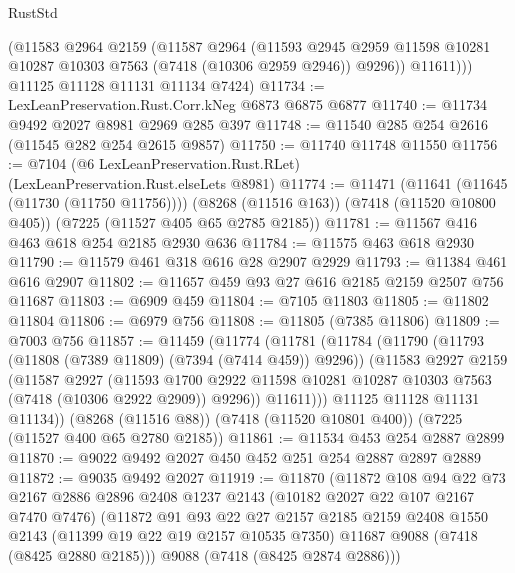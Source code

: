 \begin{lexlean}{RustStd}
\begin{coremodule}
          (@11583
            @2964
            @2159
            (@11587
              @2964
              (@11593
                @2945
                @2959
                @11598
                @10281
                @10287
                @10303
                @7563
                (@7418 (@10306 @2959 @2946))
                @9296))
            @11611)))
      @11125
      @11128
      @11131
      @11134
      @7424)
@11734 := LexLeanPreservation.Rust.Corr.kNeg @6873 @6875 @6877
@11740 := @11734 @9492 @2027 @8981 @2969 @285 @397
@11748 := @11540 @285 @254 @2616 (@11545 @282 @254 @2615 @9857)
@11750 := @11740 @11748 @11550
@11756 := @7104 (@6 LexLeanPreservation.Rust.RLet) (LexLeanPreservation.Rust.elseLets @8981)
@11774 := @11471
    (@11641 (@11645 (@11730 (@11750 @11756))))
    (@8268 (@11516 @163))
    (@7418 (@11520 @10800 @405))
    (@7225 (@11527 @405 @65 @2785 @2185))
@11781 := @11567 @416 @463 @618 @254 @2185 @2930 @636
@11784 := @11575 @463 @618 @2930
@11790 := @11579 @461 @318 @616 @28 @2907 @2929
@11793 := @11384 @461 @616 @2907
@11802 := @11657 @459 @93 @27 @616 @2185 @2159 @2507 @756 @11687
@11803 := @6909 @459
@11804 := @7105 @11803
@11805 := @11802 @11804
@11806 := @6979 @756
@11808 := @11805 (@7385 @11806)
@11809 := @7003 @756
@11857 := @11459
    (@11774
      (@11781
        (@11784
          (@11790
            (@11793 (@11808 (@7389 @11809) (@7394 (@7414 @459)) @9296))
            (@11583
              @2927
              @2159
              (@11587
                @2927
                (@11593
                  @1700
                  @2922
                  @11598
                  @10281
                  @10287
                  @10303
                  @7563
                  (@7418 (@10306 @2922 @2909))
                  @9296))
              @11611)))
        @11125
        @11128
        @11131
        @11134))
    (@8268 (@11516 @88))
    (@7418 (@11520 @10801 @400))
    (@7225 (@11527 @400 @65 @2780 @2185))
@11861 := @11534 @453 @254 @2887 @2899
@11870 := @9022 @9492 @2027 @450 @452 @251 @254 @2887 @2897 @2889
@11872 := @9035 @9492 @2027
@11919 := @11870
    (@11872
      @108
      @94
      @22
      @73
      @2167
      @2886
      @2896
      @2408
      @1237
      @2143
      (@10182 @2027 @22 @107 @2167 @7470 @7476)
      (@11872
        @91
        @93
        @22
        @27
        @2157
        @2185
        @2159
        @2408
        @1550
        @2143
        (@11399 @19 @22 @19 @2157 @10535 @7350)
        @11687
        @9088
        (@7418 (@8425 @2880 @2185)))
      @9088
      (@7418 (@8425 @2874 @2886)))

\end{coremodule}
\end{lexlean}
